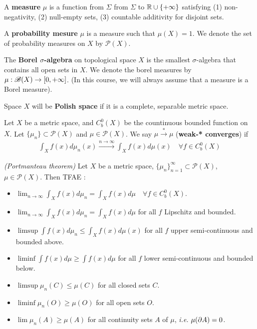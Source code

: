 \documentclass[12pt,a4paper]{article}
\renewenvironment{i}
{\begin{itemize} 
	}%
	{\end{itemize}
}
\begin{document}
\quad A \textbf{measure} $\mu$ is a function from $\Sigma$ from $\Sigma$ to $\mathbb{R} \cup \{+ \infty\}$ satisfying (1) non-negativity, (2) null-empty sets, (3) countable additivity for disjoint sets.

\quad A \textbf{probability mesure} $\mu$ is a measure such that $\mu(X)=1$. We denote the set of probability measures on $X$ by $\mathscr{P}(X)$.

\quad The \textbf{Borel $\sigma$-algebra} on topological space $X$ is the smallest $\sigma$-algebra that contains all open sets in $X$. We denote the borel measures by $\mu : \mathscr{B}(X) \rightarrow [0, +\infty]$. (In this course, we will always assume that a measure is a Borel measure).

\quad Space $X$ will be \textbf{Polish space} if it is a complete, separable metric space.
\s

 Let $X$ be a metric space, and $C_b^0(X)$ be the countinuous bounded function on $X$. Let $\{\mu_n\} \subset \mathscr{P}(X)$ and $\mu\in \mathscr{P}(X)$. We say $\mu \xrightarrow{*} \mu$ (\textbf{weak-* converges}) if
\begin{align*}
\int_X f(x) d\mu_n(x) \xrightarrow{n\rightarrow \infty} \int_X f(x) d\mu(x) \quad \forall f\in C_b^0(X)
\end{align*}
\s

 \emph{(Portmanteau theorem)} Let $X$ be a metric space, $\{\mu_n\}_{n=1}^{\infty} \subset \mathscr{P}(X)$, $\mu \in \mathscr{P}(X)$. Then TFAE :
\begin{i}
\item $\lim_{n\rightarrow \infty} \int_X f(x) d\mu_n =\int_X f(x) d\mu \quad \forall f\in C_b^0(X)$.
\item $\lim_{n\rightarrow \infty} \int_X f(x) d\mu_n =\int_X f(x) d\mu$ for all $f$ Lipschitz and bounded.
\item $\limsup \int f(x) d\mu_n \leq \int_X f(x) d\mu(x)$ for all $f$ upper semi-continuous and bounded above.
\item $\liminf \int f(x) d\mu \geq \int f(x) d\mu$ for all $f$ lower semi-continuous and bounded below.
\item $\limsup \mu_n(C) \leq \mu(C)$ for all closed sets $C$.
\item $\liminf \mu_n(O) \geq \mu(O)$ for all open sets $O$.
\item $\lim \mu_n(A) \geq \mu(A)$ for all continuity sets $A$ of $\mu$, \textit{i.e.} $\mu(\partial A) =0$.
\end{i}
\s
\end{document}
